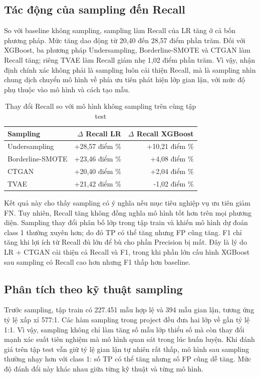 \documentclass[12pt,a4paper]{article}
\begin{document}
\subsection{Tác động của sampling đến Recall}

So với baseline không sampling, sampling làm Recall của LR tăng ở cả bốn phương pháp. Mức tăng dao động từ 20,40 đến 28,57 điểm phần trăm. Đối với XGBoost, ba phương pháp Undersampling, Borderline-SMOTE và CTGAN làm Recall tăng; riêng TVAE làm Recall giảm nhẹ 1,02 điểm phần trăm. Vì vậy, nhận định chính xác không phải là sampling luôn cải thiện Recall, mà là sampling nhìn chung dịch chuyển mô hình về phía ưu tiên phát hiện lớp gian lận, với mức độ phụ thuộc vào mô hình và cách tạo mẫu.

\begin{table}[H]
    \centering
    \begin{tabular}{lrr}
        \toprule
        \textbf{Sampling} & \textbf{$\Delta$ Recall LR} & \textbf{$\Delta$ Recall XGBoost} \\
        \midrule
        Undersampling & +28,57 điểm \% & +10,21 điểm \% \\
        Borderline-SMOTE & +23,46 điểm \% & +4,08 điểm \% \\
        CTGAN & +20,40 điểm \% & +2,04 điểm \% \\
        TVAE & +21,42 điểm \% & -1,02 điểm \% \\
        \bottomrule
    \end{tabular}
    \caption{Thay đổi Recall so với mô hình không sampling trên cùng tập test}
    \label{tab:recall-change}
\end{table}

Kết quả này cho thấy sampling có ý nghĩa nếu mục tiêu nghiệp vụ ưu tiên giảm FN. Tuy nhiên, Recall tăng không đồng nghĩa mô hình tốt hơn trên mọi phương diện. Sampling thay đổi phân bố lớp trong tập train và khiến mô hình dự đoán class 1 thường xuyên hơn; do đó TP có thể tăng nhưng FP cũng tăng. F1 chỉ tăng khi lợi ích từ Recall đủ lớn để bù cho phần Precision bị mất. Đây là lý do LR + CTGAN cải thiện cả Recall và F1, trong khi phần lớn cấu hình XGBoost sau sampling có Recall cao hơn nhưng F1 thấp hơn baseline.

\subsection{Phân tích theo kỹ thuật sampling}

Trước sampling, tập train có 227.451 mẫu hợp lệ và 394 mẫu gian lận, tương ứng tỷ lệ xấp xỉ 577:1. Các hàm sampling trong project đều đưa hai lớp về gần tỷ lệ 1:1. Vì vậy, sampling không chỉ làm tăng số mẫu lớp thiểu số mà còn thay đổi mạnh xác suất tiên nghiệm mà mô hình quan sát trong lúc huấn luyện. Khi đánh giá trên tập test vẫn giữ tỷ lệ gian lận tự nhiên rất thấp, mô hình sau sampling thường nhạy hơn với class 1: số TP có thể tăng nhưng số FP cũng dễ tăng. Mức độ đánh đổi này khác nhau giữa từng kỹ thuật và từng mô hình.
\end{document}
